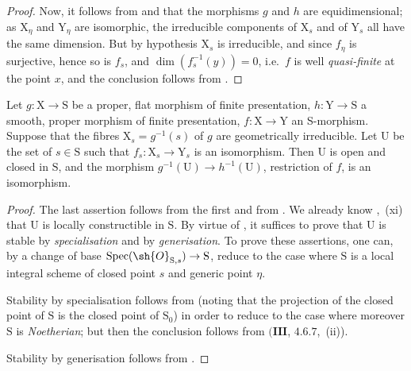 \begin{proof}
Now, it follows from  and  that the morphisms $g$ and $h$ are equidimensional; as $\mathrm{X}_\eta$ and $\mathrm{Y}_\eta$ are isomorphic, the irreducible components of $\mathrm{X}_s$ and of $\mathrm{Y}_s$ all have the same dimension.
But by hypothesis $\mathrm{X}_s$ is irreducible, and since $f_\eta$ is surjective, hence so is $f_s$, and $\dim(f_s^{-1}(y))=0$, i.e.\ $f$ is well \emph{quasi-finite} at the point $x$, and the conclusion follows from .
\end{proof}

\begin{corollary}[21.12.16]
\label{IV.21.12.16}
Let $g:\mathrm{X}\to\mathrm{S}$ be a proper, flat morphism of finite presentation, $h:\mathrm{Y}\to\mathrm{S}$ a smooth, proper morphism of finite presentation, $f:\mathrm{X}\to\mathrm{Y}$ an S-morphism.
Suppose that the fibres $\mathrm{X}_s=g^{-1}(s)$ of $g$ are geometrically irreducible.
Let $\mathrm{U}$ be the set of $s\in\mathrm{S}$ such that $f_s:\mathrm{X}_s\to\mathrm{Y}_s$ is an isomorphism.
Then $\mathrm{U}$ is open and closed in $\mathrm{S}$, and the morphism $g^{-1}(\mathrm{U})\to h^{-1}(\mathrm{U})$, restriction of $f$, is an isomorphism.
\end{corollary}

\begin{proof}
The last assertion follows from the first and from .
We already know ,~(xi) that $\mathrm{U}$ is locally constructible in $\mathrm{S}$.
By virtue of , it suffices to prove that $\mathrm{U}$ is stable by \emph{specialisation} and by \emph{generisation}.
To prove these assertions, one can, by a change of base $\operatorname{Spec}(\sh{O}_{\mathrm{S},s})\to\mathrm{S}$, reduce to the case where $\mathrm{S}$ is a local integral scheme of closed point $s$ and generic point $\eta$.

Stability by specialisation follows from  (noting that the projection of the closed point of $\mathrm{S}$ is the closed point of $\mathrm{S}_0$) in order to reduce to the case where moreover $\mathrm{S}$ is \emph{Noetherian}; but then the conclusion follows from $(\mathbf{III}$, $4.6.7$,~(ii)).

Stability by generisation follows from .
\end{proof}


